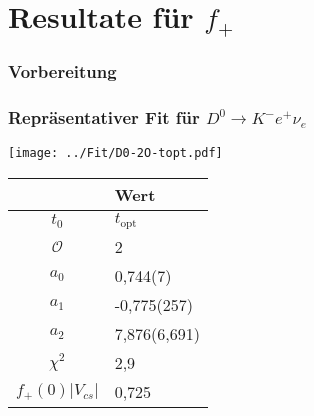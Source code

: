 \documentclass[hyperref={pdfpagelabels=false}]{beamer}
\begin{document}
\section{Resultate für $f_+$}
\begin{frame}
\tableofcontents[currentsection]
\end{frame}

\begin{frame}
 \frametitle{Vorbereitung}
 \pause
 \begin{itemize}
 \end{itemize}
\end{frame}

\begin{frame}
 \frametitle{Repräsentativer Fit für $D^0\rightarrow K^- e^+ \nu_e$}
  \begin{minipage}[h]{0.66\textwidth}
  \texttt{[image: ../Fit/D0-2O-topt.pdf]}
 \end{minipage}
 \begin{minipage}[h]{0.32\textwidth}
  \begin{table}[h]
   \begin{tabular}{c|l}
   \toprule
     & Wert\\
    \midrule
    $t_0$ & $t_\text{opt}$\\
    $\mathcal{O}$ & 2\\
    \midrule
    $a_0$ & 0,744(7)\\
    $a_1$ & -0,775(257)\\
    $a_2$ & 7,876(6,691)\\
    \midrule
    $\chi^2$ & 2,9\\
    $f_+(0)|V_{cs}|$ & 0,725\\
    \bottomrule\bottomrule
   \end{tabular}

  \end{table}

 \end{minipage}
\end{frame}
\end{document}
